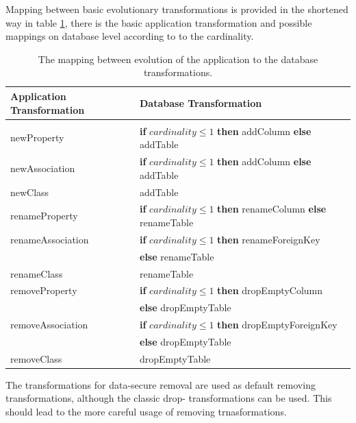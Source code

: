 \documentclass[runningheads]{comsis}
\begin{document}
Mapping between basic evolutionary transformations is provided in the shortened way in table \ref{tab:sw-basic-evolution}, there is the basic application transformation and possible mappings on database level according to to the cardinality.  
\begin{table}
	\caption{The mapping between evolution of the application to the database transformations.}
	\label{tab:sw-basic-evolution}
\centering
	\begin{tabular}{ll}
		\hline
	Application Transformation & Database Transformation \\
	\hline
	\\[-2ex] 
	newProperty & \textbf{if} $cardinality \leq 1$ \textbf{then} addColumn \textbf{else} addTable \\ 

	newAssociation & \textbf{if} $cardinality \leq 1$ \textbf{then} addColumn  \textbf{else} addTable \\

	newClass & addTable \\
	renameProperty & \textbf{if} $cardinality \leq 1$ \textbf{then}  renameColumn  \textbf{else} renameTable \\

	renameAssociation & \textbf{if} $cardinality \leq 1$ \textbf{then} renameForeignKey \\ & \hspace{1in} \textbf{else} renameTable \\
	
	renameClass & renameTable \\
	removeProperty & \textbf{if} $cardinality \leq 1$ \textbf{then} dropEmptyColumn  \\ & \hspace{1in}\textbf{else} dropEmptyTable \\
	
	removeAssociation & \textbf{if} $cardinality \leq 1$ \textbf{then}  dropEmptyForeignKey \\ & \hspace{1in} \textbf{else} dropEmptyTable \\

	removeClass & dropEmptyTable\\
	\hline
	\end{tabular}
\end{table}
The transformations for data-secure removal are used as default removing transformations, although the classic drop- transformations can be used. This should lead to the more careful usage of removing trnasformations.
\end{document}

